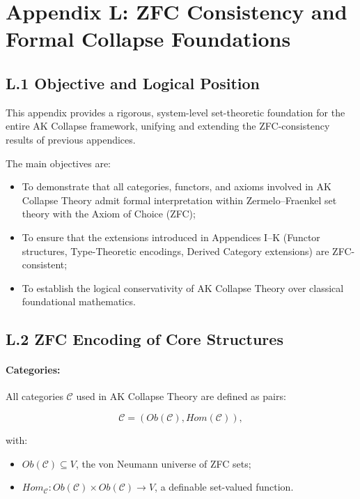 \documentclass[11pt]{article}
\begin{document}
\section*{Appendix L: ZFC Consistency and Formal Collapse Foundations}

\subsection*{L.1 Objective and Logical Position}

This appendix provides a rigorous, system-level set-theoretic foundation for the entire AK Collapse framework, unifying and extending the ZFC-consistency results of previous appendices.

The main objectives are:

\begin{itemize}
    \item To demonstrate that all categories, functors, and axioms involved in AK Collapse Theory admit formal interpretation within Zermelo–Fraenkel set theory with the Axiom of Choice (ZFC);
    \item To ensure that the extensions introduced in Appendices I–K (Functor structures, Type-Theoretic encodings, Derived Category extensions) are ZFC-consistent;
    \item To establish the logical conservativity of AK Collapse Theory over classical foundational mathematics.
\end{itemize}

\subsection*{L.2 ZFC Encoding of Core Structures}

\paragraph{Categories:}  
All categories \( \mathcal{C} \) used in AK Collapse Theory are defined as pairs:

\[
\mathcal{C} = (Ob(\mathcal{C}), Hom(\mathcal{C})),
\]

with:

\begin{itemize}
    \item \( Ob(\mathcal{C}) \subseteq V \), the von Neumann universe of ZFC sets;
    \item \( Hom_{\mathcal{C}} : Ob(\mathcal{C}) \times Ob(\mathcal{C}) \to V \), a definable set-valued function.
\end{itemize}
\end{document}
